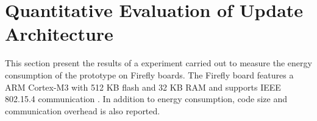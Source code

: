 \documentclass[0-thesis.tex]{subfiles}
\begin{document}


\section{Quantitative Evaluation of Update Architecture}
\label{sec:quant-evaluation}
This section present the results of a experiment carried out to measure the energy
consumption of the prototype on Firefly boards. The Firefly board features a ARM Cortex-M3
with 512 KB flash and 32 KB RAM and supports IEEE 802.15.4 communication
\parencite{firefly-datasheet}. In addition to energy consumption, code size and
communication overhead is also reported. 
\end{document}
